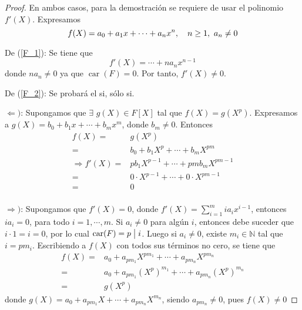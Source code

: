 \documentclass[12pt]{report}
\theoremstyle{largebreak}
\newcommand\divides{\ensuremath{\bigm|}}
\DeclareMathOperator{\car}{car}
\begin{document}
    \begin{proof}
        En ambos casos, para la demostración se requiere de usar el polinomio $f'(X)$. Expresamos
        \begin{equation}
            f(X)=a_0+a_1x+\cdots+a_nx^n,\quad n\geq1,\textup{ }a_n\neq0
        \end{equation}
        
        De (\ref{F_1}): Se tiene que
        \begin{equation*}
            f'(X)=\cdots+na_nx^{n-1}
        \end{equation*}
        donde $na_n\neq0$ ya que $\car(F)=0$. Por tanto, $f'(X)\neq0$. 

        De (\ref{F_2}): Se probará el si, sólo si.

        $\Leftarrow)$: Supongamos que $\exists$ $g(X)\in F[X]$ tal que $f(X)=g(X^p)$. Expresamos a $g(X)=b_0+b_1x+\cdots+b_mx^m$, donde $b_m\neq0$. Entonces
        \begin{equation*}
            \begin{split}
                f(X)=&g(X^p)\\
                =&b_0+b_1X^p+\cdots+b_mX^{pm}\\
                \Rightarrow f'(X)=&pb_1X^{p-1}+\cdots+pmb_mX^{pm-1}\\
                =&0\cdot X^{p-1}+\cdots+0\cdot X^{pm-1}\\
                =&0\\
            \end{split}
        \end{equation*}  

        $\Rightarrow)$: Supongamos que $f'(X)=0$, donde $f'(X)=\sum_{i=1}^{m}ia_ix^{i-1}$, entonces $ia_i=0$, para todo $i=1,\cdots,m$. Si $a_i\neq0$ para algún $i$, entonces debe suceder que $i\cdot1=i=0$, por lo cual $\car(F)=p\divides i$. Luego si $a_i\neq0$, existe $m_i\in\mathbb{N}$ tal que $i=pm_i$. Escribiendo a $f(X)$ con todos sus términos no cero, se tiene que
        \begin{equation*}
            \begin{split}
                f(X)=&a_0+a_{pm_1}X^{pm_1}+\cdots+a_{pm_n}X^{pm_n}\\
                =&a_0+a_{pm_1}(X^p)^{m_1}+\cdots+a_{pm_n}(X^p)^{m_n}\\
                =&g(X^p)
            \end{split}
        \end{equation*}
        donde $g(X)=a_0+a_{pm_1}X+\cdots+a_{pm_n}X^{m_n}$, siendo $a_{pm_n}\neq0$, pues $f(X)\neq0$
    \end{proof}
\end{document}
